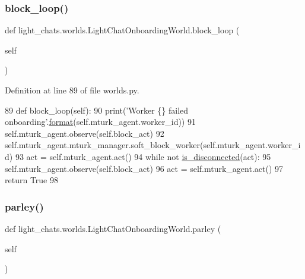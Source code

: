 \subsubsection{\texorpdfstring{block\+\_\+loop()}{block\_loop()}}
{\footnotesize\ttfamily def light\+\_\+chats.\+worlds.\+Light\+Chat\+Onboarding\+World.\+block\+\_\+loop (\begin{DoxyParamCaption}\item[{}]{self }\end{DoxyParamCaption})}



Definition at line 89 of file worlds.\+py.


\begin{DoxyCode}
89     \textcolor{keyword}{def }block\_loop(self):
90         print(\textcolor{stringliteral}{'Worker \{\} failed onboarding'}.\hyperlink{namespaceparlai_1_1chat__service_1_1services_1_1messenger_1_1shared__utils_a32e2e2022b824fbaf80c747160b52a76}{format}(self.mturk\_agent.worker\_id))
91         self.mturk\_agent.observe(self.block\_act)
92         self.mturk\_agent.mturk\_manager.soft\_block\_worker(self.mturk\_agent.worker\_id)
93         act = self.mturk\_agent.act()
94         \textcolor{keywordflow}{while} \textcolor{keywordflow}{not} \hyperlink{namespacelight__chats_1_1worlds_a43b0aff73307cda95a089763b77f40d3}{is\_disconnected}(act):
95             self.mturk\_agent.observe(self.block\_act)
96             act = self.mturk\_agent.act()
97         \textcolor{keywordflow}{return} \textcolor{keyword}{True}
98 
\end{DoxyCode}
\mbox{\label{classlight__chats_1_1worlds_1_1LightChatOnboardingWorld_ade47ed749c72e46f2f692a96aaede09a}} 
\subsubsection{\texorpdfstring{parley()}{parley()}}
{\footnotesize\ttfamily def light\+\_\+chats.\+worlds.\+Light\+Chat\+Onboarding\+World.\+parley (\begin{DoxyParamCaption}\item[{}]{self }\end{DoxyParamCaption})}



